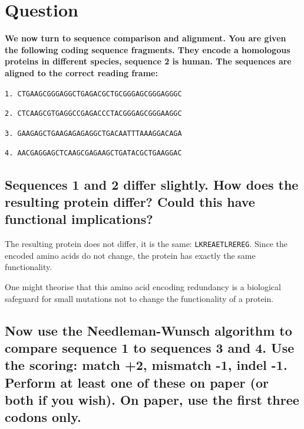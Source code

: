 \section{Question}

\large{\textbf{We now turn to sequence comparison and alignment. You are given the following coding sequence fragments. They encode a homologous proteins in different species, sequence 2 is human. The sequences are aligned to the correct reading frame:}}

\medskip

\texttt{1. CTGAAGCGGGAGGCTGAGACGCTGCGGGAGCGGGAGGGC}

\texttt{2. CTCAAGCGTGAGGCCGAGACCCTACGGGAGCGGGAAGGC}

\texttt{3. GAAGAGCTGAAGAGAGAGGCTGACAATTTAAAGGACAGA}

\texttt{4. AACGAGGAGCTCAAGCGAGAAGCTGATACGCTGAAGGAC}

\medskip


\subsection{Sequences 1 and 2 differ slightly. How does the resulting protein differ? Could this have functional implications?}

The resulting protein does not differ, it is the same: \texttt{LKREAETLREREG}. Since the encoded amino acids do not change, the protein has exactly the same functionality.

One might theorise that this amino acid encoding redundancy is a biological safeguard for small mutations not to change the functionality of a protein.

\medskip


\subsection{Now use the Needleman-Wunsch algorithm to compare sequence 1 to sequences 3 and 4. Use the scoring: match +2, mismatch -1, indel -1. Perform at least one of these on paper (or both if you wish). On paper, use the first three codons only.}

